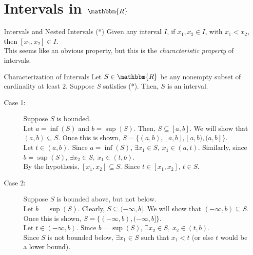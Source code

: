 \documentclass[10pt]{extarticle}
\newcommand{\R}{\mathbbm{R}}
\begin{document}
  \section*{Intervals in $\R$}%
  \begin{problem}{Intervals and Nested Intervals}
    (*) Given any interval $I$, if $x_1,x_2\in I$, with $x_1 < x_2$, then $[x_1,x_2]\in I$.\\

    This seems like an obvious property, but this is the \textsl{characteristic property} of intervals.
    \begin{problem}{Characterization of Intervals}
      Let $S\in\R$ be any nonempty subset of cardinality at least $2$. Suppose $S$ satisfies (*). Then, $S$ is an interval.
      \tcblower
      \begin{description}
        \item[Case 1:] Suppose $S$ is bounded.\\

          Let $a = \inf(S)$ and $b = \sup(S)$. Then, $S \subseteq [a,b]$. We will show that $(a,b)\subseteq S$. Once this is shown, $S = \{(a,b), [a,b], [a,b), (a,b]\}$.\\

          Let $t\in (a,b)$. Since $a = \inf(S)$, $\exists x_1\in S,~x_1 \in (a,t)$. Similarly, since $b = \sup(S)$, $\exists x_2\in S,~x_1\in (t,b)$.\\

          By the hypothesis, $[x_1,x_2]\subseteq S$. Since $t\in [x_1,x_2]$, $t\in S$.
        \item[Case 2:] Suppose $S$ is bounded above, but not below.\\

          Let $b = \sup(S)$. Clearly, $S \subseteq (-\infty,b]$. We will show that $(-\infty,b)\subseteq S$. Once this is shown, $S = \{(-\infty,b), (-\infty,b]\}$.\\

          Let $t\in (-\infty,b)$. Since $b = \sup(S)$, $\exists x_2\in S,~x_2\in (t,b)$.\\

          Since $S$ is not bounded below, $\exists x_1\in S$ such that $x_1 < t$ (or else $t$ would be a lower bound).\\


\end{description}
\end{problem}
\end{problem}
\end{document}
